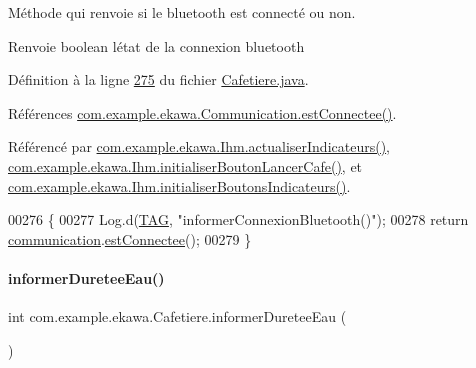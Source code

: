 Méthode qui renvoie si le bluetooth est connecté ou non. 

\begin{DoxyReturn}{Renvoie}
boolean l\textquotesingle{}état de la connexion bluetooth 
\end{DoxyReturn}


Définition à la ligne \hyperlink{_cafetiere_8java_source_l00275}{275} du fichier \hyperlink{_cafetiere_8java_source}{Cafetiere.\+java}.



Références \hyperlink{_communication_8java_source_l00260}{com.\+example.\+ekawa.\+Communication.\+est\+Connectee()}.



Référencé par \hyperlink{_ihm_8java_source_l00855}{com.\+example.\+ekawa.\+Ihm.\+actualiser\+Indicateurs()}, \hyperlink{_ihm_8java_source_l00526}{com.\+example.\+ekawa.\+Ihm.\+initialiser\+Bouton\+Lancer\+Cafe()}, et \hyperlink{_ihm_8java_source_l00357}{com.\+example.\+ekawa.\+Ihm.\+initialiser\+Boutons\+Indicateurs()}.


\begin{DoxyCode}
00276     \{
00277         Log.d(\hyperlink{classcom_1_1example_1_1ekawa_1_1_cafetiere_aa0c1fd99a2508b06c462aea17034aa91}{TAG}, \textcolor{stringliteral}{"informerConnexionBluetooth()"});
00278         \textcolor{keywordflow}{return} \hyperlink{classcom_1_1example_1_1ekawa_1_1_cafetiere_af9506a7805d000d2cb83444cdb8ea889}{communication}.\hyperlink{classcom_1_1example_1_1ekawa_1_1_communication_a0c591a578528edaa5bb665cede5738bc}{estConnectee}();
00279     \}
\end{DoxyCode}
\mbox{\label{classcom_1_1example_1_1ekawa_1_1_cafetiere_a078b7b5343bfbc06dec35dbd8fb292be}} 
\paragraph{\texorpdfstring{informer\+Duretee\+Eau()}{informerDureteeEau()}}
{\footnotesize\ttfamily int com.\+example.\+ekawa.\+Cafetiere.\+informer\+Duretee\+Eau (\begin{DoxyParamCaption}{ }\end{DoxyParamCaption})}



